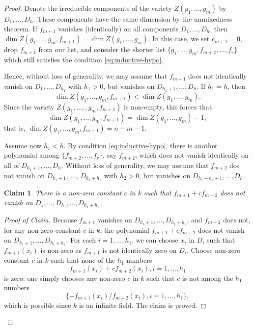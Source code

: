 \documentclass{amsart}
\numberwithin{equation}{section}
\theoremstyle{plain}
\newtheorem*{claim}{Claim}
\theoremstyle{definition}
\begin{document}
\begin{proof}
  Denote the irreducible components of the
  variety \(Z(g_1, ..., g_m)\) by
  \(D_1, \ldots, D_h\). These components
  have the same dimension by the unmixedness theorem.
  If \(f_{m+1}\) vanishes (identically) on all components \(D_1, \ldots, D_h\),
  then \(\dim Z(g_1,..., g_m, f_{m+1}) = \dim Z(g_1,..., g_m)\).
  In this case, we set \(c_{m+1}=0\), drop \(f_{m+1}\) from our list, and consider
  the shorter list \(\{g_1,\ldots, g_m, f_{m+2}, \ldots, f_r\}\) which
  still satisfies the condition \eqref{eq:inductive-hypo}.

  Hence, without loss of generality, we may assume that
  \(f_{m+1}\) does not identically vanish on \(D_1, \ldots, D_{h_1}\)
  with \(h_1>0\), but vanishes on \(D_{h_1+1}, \ldots, D_h\).
  If \(h_1=h\), then
  \[
    \dim Z(g_1,\ldots, g_m, f_{m+1}) < \dim Z(g_1,\ldots, g_m).
  \]
  Since the variety \(Z(g_1,\ldots,,g_{m},f_{m+1})\) is non-empty, this forces
  that
  \[
    \dim Z(g_1,\ldots, g_m, f_{m+1}) = \dim Z(g_1,\ldots, g_m) - 1,
  \]
  that is, \(\dim Z(g_1, ..., g_m, f_{m+1}) = n-m-1\).

  Assume now \(h_1 < h\). By condition \eqref{eq:inductive-hypo}, there is
  another polynomial among \(\{f_{m+2}, \ldots, f_r\}\),
  say \(f_{m+2}\), which does not vanish identically on
  all of \(D_{h_1+1}, \ldots, D_h\). Without loss of generality,
  we may assume that \(f_{m+2}\) dos not vanish on
  \(D_{h_1+1}\), \(\ldots\), \(D_{h_1+h_2}\) with \(h_2>0\),
  but vanishes on \(D_{h_1+h_2+1}, \ldots, D_h\).


  \begin{claim} \textit{There is a non-zero constant \(c\) in \(k\) such that
  \(f_{m+1}+cf_{m+2}\) does not vanish on}
  \(D_1, \ldots, D_{h_1}, \ldots, D_{h_1+h_2}\).
  \end{claim}

  \begin{proof}[Proof of Claim]
    Because \(f_{m+1}\) vanishes on
    \(D_{h_1+1},\ldots, D_{h_1+h_2}\), and \(f_{m+2}\) does not,
    for any non-zero constant \(c\) in \(k\),
    the polynomial \(f_{m+1} + cf_{m+2}\) does not vanish on
    \(D_{h_1+1},\ldots, D_{h_1+h_2}\). For each \(i =1, \ldots, h_1\),
    we can choose \(x_i\) in \(D_i\) such that \(f_{m+1}(x_i)\) is non-zero as
    \(f_{m+1}\) is not identically zero on \(D_i\). Choose non-zero
    constant \(c\) in \(k\) such that none of the \(h_1\) numbers
    \begin{equation*}
      f_{m+1}(x_i) + c f_{m+2}(x_i) , i=1,\ldots, h_1
    \end{equation*}
    is zero: one simply chooses
    any non-zero \(c\) in \(k\) such that \(c\) is not among the \(h_1\) numbers
    \[\{-f_{m+1}(x_i)/f_{m+2}(x_i), i=1,\ldots, h_1\},\] which is possible
    since \(k\) is an infinite field. The claim is proved.
  \end{proof}


\end{proof}
\end{document}
